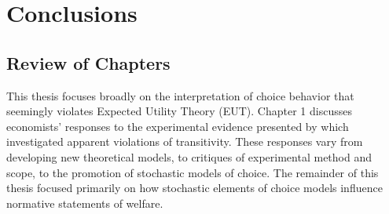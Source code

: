 \documentclass[../main.tex]{subfiles}
\begin{document}
\doublespacing
\setcounter{chapter}{4}

\chapter{Conclusions}


\section{Review of Chapters}


This thesis focuses broadly on the interpretation of choice behavior that seemingly violates Expected Utility Theory (EUT).
Chapter 1 discusses economists' responses to the experimental evidence presented by \textcite{Grether1979} which investigated apparent violations of transitivity.
These responses vary from developing new theoretical models, to critiques of experimental method and scope, to the promotion of stochastic models of choice.
The remainder of this thesis focused primarily on how stochastic elements of choice models influence normative statements of welfare.
\end{document}
